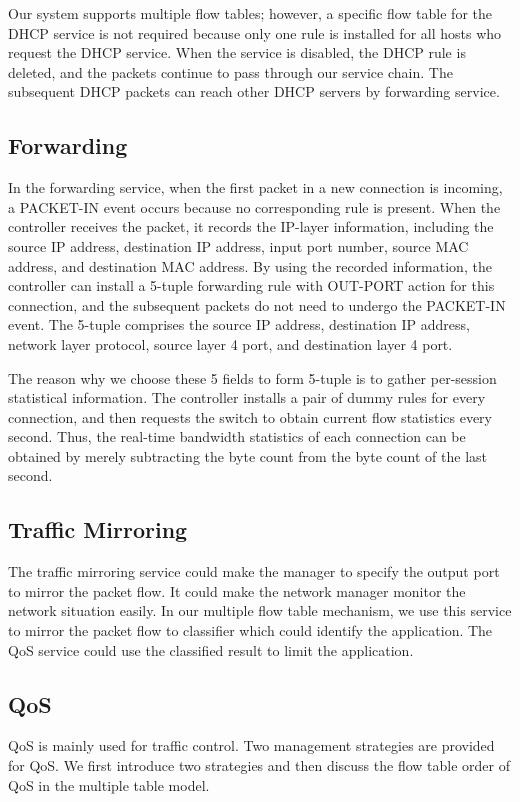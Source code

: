 Our system supports multiple flow tables; however, a specific flow table for the DHCP service is not required because only one rule is installed for all hosts who request the DHCP service. When the service is disabled, the DHCP rule is deleted, and the packets continue to pass through our service chain. The subsequent DHCP packets can reach other DHCP servers by forwarding service.


\subsection{Forwarding} \label{ssec:forwarding}
In the forwarding service, when the first packet in a new connection is incoming, a PACKET-IN event occurs because no corresponding rule is present. When the controller receives the packet, it records the IP-layer information, including the source IP address, destination IP address, input port number, source MAC address, and destination MAC address. By using the recorded information, the controller can install a 5-tuple forwarding rule with OUT-PORT action for this connection, and the subsequent packets do not need to undergo the PACKET-IN event. The 5-tuple comprises the source IP address, destination IP address, network layer protocol, source layer 4 port, and destination layer 4 port.

The reason why we choose these 5 fields to form 5-tuple is to gather per-session statistical information. The controller installs a pair of dummy rules for every connection, and then requests the switch to obtain current flow statistics every second. Thus, the real-time bandwidth statistics of each connection can be obtained by merely subtracting the byte count from the byte count of the last second.


\subsection{Traffic Mirroring} \label{ssec:mirror}
The traffic mirroring service could make the manager to specify the output port to mirror the packet flow.
It could make the network manager monitor the network situation easily.
In our multiple flow table mechanism, we use this service to mirror the packet flow to classifier which could identify the application.
The QoS service could use the classified result to limit the application.


\subsection{QoS}
QoS is mainly used for traffic control. Two management strategies are provided for QoS. We first introduce two strategies and then discuss the flow table order of QoS in the multiple table model.

